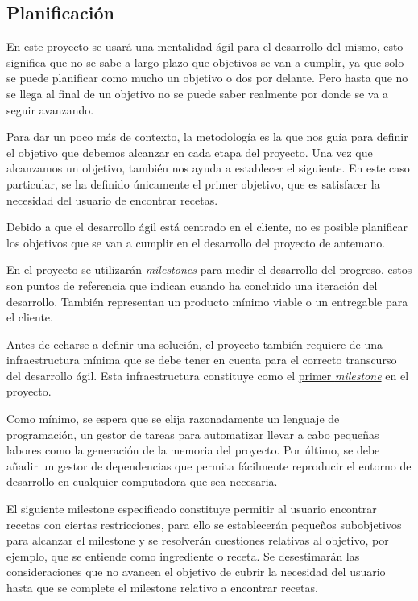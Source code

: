 \begin{enumerate}
\section{Planificación}
En este proyecto se usará una mentalidad ágil para el desarrollo del mismo, esto significa que no se sabe a largo plazo que objetivos se van a cumplir, ya que solo se puede planificar como mucho un objetivo o dos por delante. Pero hasta que no se llega al final de un objetivo no se puede saber realmente por donde se va a seguir avanzando.

Para dar un poco más de contexto, la metodología es la que nos guía para definir el objetivo que debemos alcanzar en cada etapa del proyecto. Una vez que alcanzamos un objetivo, también nos ayuda a establecer el siguiente. En este caso particular, se ha definido únicamente el primer objetivo, que es satisfacer la necesidad del usuario de encontrar recetas. 

Debido a que el desarrollo ágil está centrado en el cliente, no es posible planificar los objetivos que se van a cumplir en el desarrollo del proyecto de antemano.  

En el proyecto se utilizarán \emph{\glspl{milestone}} para medir el desarrollo del progreso, estos son puntos de referencia que indican cuando ha concluido una iteración del desarrollo. También representan un producto mínimo viable o un entregable para el cliente.\cite{milestone2022}

Antes de echarse a definir una solución, el proyecto también requiere de una infraestructura mínima que se debe tener en cuenta para el correcto transcurso del desarrollo ágil. Esta infraestructura constituye como el \href{https://github.com/Slowmybrosh/TFG-DietPlanner/milestone/10}{primer \emph{\gls{milestone}}} en el proyecto.

Como mínimo, se espera que se elija razonadamente un lenguaje de programación, un gestor de tareas para automatizar llevar a cabo pequeñas labores como la generación de la memoria del proyecto. Por último, se debe añadir un gestor de dependencias que permita fácilmente reproducir el entorno de desarrollo en cualquier computadora que sea necesaria.

El siguiente milestone especificado constituye permitir al usuario encontrar recetas con ciertas restricciones, para ello se establecerán pequeños subobjetivos para alcanzar el milestone y se resolverán cuestiones relativas al objetivo, por ejemplo, que se entiende como ingrediente o receta. Se desestimarán las consideraciones que no avancen el objetivo de cubrir la necesidad del usuario hasta que se complete el milestone relativo a encontrar recetas.


\end{enumerate}
